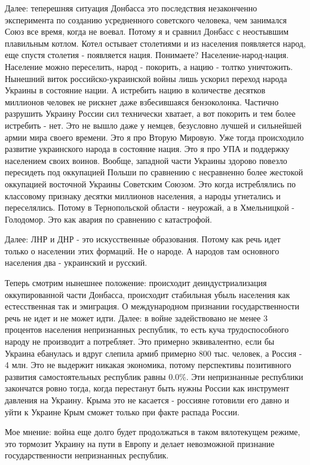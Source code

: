 \begin{itemize}
\begin{itemize}
Далее: теперешняя ситуация Донбасса это последствия незаконченно эксперимента
по созданию усредненного советского человека, чем занимался Союз все время,
когда не воевал. Потому я и сравнил Донбасс с неостывшим плавильным котлом.
Котел остывает столетиями и из населения появляется народ, еще спустя столетия
- появляется нация. Понимаете? Население-народ-нация. Население можно
переселить, народ - покорить, а нацию - толтко уничтожить. Нынешний виток
российско-украинской войны лишь ускорил переход народа Украины в состояние
нации. А истребить нацию в количестве десятков миллионов человек не рискнет
даже взбесившаяся бензоколонка. Частично разрушить Украину России сил
технически хватает, а вот покорить и тем более истребить - нет. Это не вышло
даже у немцев, безусловно лучшей и сильнейшей армии мира своего времени. Это я
про Вторую Мировую. Уже тогда происходило развитие украинского народа в
состояние нация. Это я про УПА и поддержку населением своих воинов. Вообще,
западной части Украины здорово повезло пересидеть под оккупацией Польши по
сравнению с несравненно более жестокой оккупацией восточной Украины Советским
Союзом. Это когда истреблялись по классовому признаку десятки миллионов
населения, а народы угнетались и переселялись. Потому в Тернопольской области -
неурожай, а в Хмельницкой - Голодомор. Это как авария по сравнению с
катастрофой.

Далее: ЛНР и ДНР - это искусственные образования. Потому как речь идет только о
населении этих формаций. Не о народе. А народов там основного населения два -
украинский и русский.

Теперь смотрим нынешнее положение: происходит деиндустриализация оккупированной
части Донбасса, происходит стабильная убыль населения как естесственная так и
эмиграция. О международном признании государственности речь не идет и не может
идти. Далее: в войне задействовано не менее 3 процентов населения непризнанных
республик, то есть куча трудоспособного народу не производит а потребляет. Это
примерно эквивалентно, если бы Украина ебанулась и вдруг слепила армиб примерно
800 тыс. человек, а Россия - 4 млн. Это не выдержит никакая экономика, потому
перспективы позитивного развития самостоятельных республик равны 0.0\%. Эти
непризнанные республики закончатся ровно тогда, когда перестанут быть нужны
России как инструмент давления на Украину. Крыма это не касается - россияне
готовили его давно и уйти к Украине Крым сможет только при факте распада
России.

Мое мнение: война еще долго будет продолжаться в таком вялотекущем режиме, это
тормозит Украину на пути в Европу и делает невозможной признание
государственности непризнанных республик.


\end{itemize}
\end{itemize}

